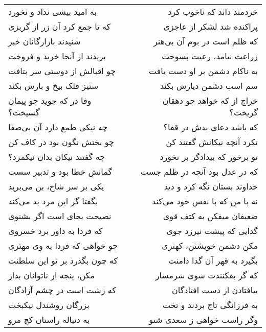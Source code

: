 \begin{center}
\begin{longtable}{l p{0.5cm} r}
به امید بیشی نداد و نخورد
&&
خردمند داند که ناخوب کرد
\\
که تا جمع کرد آن زر از گربزی
&&
پراکنده شد لشکر از عاجزی
\\
شنیدند بازارگانان خبر
&&
که ظلم است در بوم آن بی‌هنر
\\
بریدند از آنجا خرید و فروخت
&&
زراعت نیامد، رعیت بسوخت
\\
چو اقبالش از دوستی سر بتافت
&&
به ناکام دشمن بر او دست یافت
\\
ستیز فلک بیخ و بارش بکند
&&
سم اسب دشمن دیارش بکند
\\
وفا در که جوید چو پیمان گسیخت؟
&&
خراج از که خواهد چو دهقان گریخت؟
\\
چه نیکی طمع دارد آن بی‌صفا
&&
که باشد دعای بدش در قفا؟
\\
چو بختش نگون بود در کاف کن
&&
نکرد آنچه نیکانش گفتند کن
\\
چه گفتند نیکان بدان نیکمرد؟
&&
تو برخور که بیدادگر بر نخورد
\\
گمانش خطا بود و تدبیر سست
&&
که در عدل بود آنچه در ظلم جست
\\
یکی بر سر شاخ، بن می‌برید
&&
خداوند بستان نگه کرد و دید
\\
بگفتا گر این مرد بد می‌کند
&&
نه با من که با نفس خود می‌کند
\\
نصیحت بجای است اگر بشنوی
&&
ضعیفان میفکن به کتف قوی
\\
که فردا به داور برد خسروی
&&
گدایی که پیشت نیرزد جوی
\\
چو خواهی که فردا به وی مهتری
&&
مکن دشمن خویشتن، کهتری
\\
که چون بگذرد بر تو این سلطنت
&&
بگیرد به قهر آن گدا دامنت
\\
مکن، پنجه از ناتوانان بدار
&&
که گر بفکنندت شوی شرمسار
\\
که زشت است در چشم آزادگان
&&
بیافتادن از دست افتادگان
\\
بزرگان روشندل نیکبخت
&&
به فرزانگی تاج بردند و تخت
\\
به دنباله راستان کج مرو
&&
وگر راست خواهی ز سعدی شنو
\\
\end{longtable}
\end{center}
